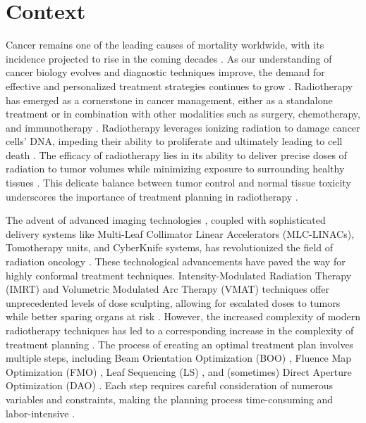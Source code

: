 \section{Context}
Cancer remains one of the leading causes of mortality worldwide, with its incidence projected to rise in the coming decades \cite{Quante2016,Smittenaar2016}.
As our understanding of cancer biology evolves and diagnostic techniques improve, the demand for effective and personalized treatment strategies continues to grow \cite{Howard2017}.
Radiotherapy has emerged as a cornerstone in cancer management, either as a standalone treatment or in combination with other modalities such as surgery, chemotherapy, and immunotherapy \cite{Rivoirard2015,Reynders2015}.
Radiotherapy leverages ionizing radiation to damage cancer cells' DNA, impeding their ability to proliferate and ultimately leading to cell death \cite{Yard2015}.
The efficacy of radiotherapy lies in its ability to deliver precise doses of radiation to tumor volumes while minimizing exposure to surrounding healthy tissues \cite{Malicki2012}.
This delicate balance between tumor control and normal tissue toxicity underscores the importance of treatment planning in radiotherapy \cite{Das2009}.

The advent of advanced imaging technologies \cite{Li_Zhang_2024}, coupled with sophisticated delivery systems like Multi-Leaf Collimator Linear Accelerators (MLC-LINACs), Tomotherapy units, and CyberKnife systems, has revolutionized the field of radiation oncology \cite{Klein_2009,Xia2001}.
These technological advancements have paved the way for highly conformal treatment techniques.
Intensity-Modulated Radiation Therapy (IMRT) and Volumetric Modulated Arc Therapy (VMAT) techniques offer unprecedented levels of dose sculpting, allowing for escalated doses to tumors while better sparing organs at risk \cite{Ng2018,Elith2011,Davidson2011}.
However, the increased complexity of modern radiotherapy techniques has led to a corresponding increase in the complexity of treatment planning \cite{Fraass2012,Robinson2008}.
The process of creating an optimal treatment plan involves multiple steps, including Beam Orientation Optimization (BOO) \cite{Pugachev2000,Pugachev2001}, Fluence Map Optimization (FMO) \cite{Lim2008,Romeijn_2004,Lee2006}, Leaf Sequencing (LS) \cite{Chen2003,Chen2005,Xia2002}, and (sometimes) Direct Aperture Optimization (DAO) \cite{Shepard2002,Earl_2003,Ahunbay2007}.
Each step requires careful consideration of numerous variables and constraints, making the planning process time-consuming and labor-intensive \cite{Wang2019}.

